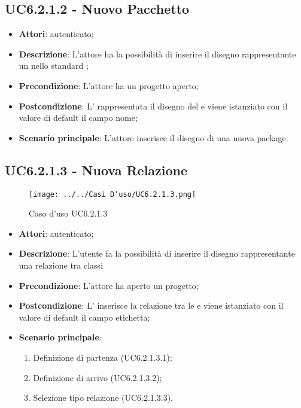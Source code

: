 \subsection{UC6.2.1.2 - Nuovo Pacchetto}
\label{ssec:UC6.2.1.2}
\begin{itemize}
\item \textbf{Attori}:  autenticato;
\item \textbf{Descrizione}: L'attore ha la possibilità di inserire il disegno rappresentante un  nello standard ;
\item \textbf{Precondizione}: L'attore ha un progetto aperto;
\item \textbf{Postcondizione}: L' rappresentata il disegno del  e viene istanziato con il valore di default il campo nome;
\item \textbf{Scenario principale}: L'attore inserisce il disegno di una nuova package.
\end{itemize}
\newpage
\subsection{UC6.2.1.3 - Nuova Relazione}
\label{ssec:UC6.2.1.3}
\begin{figure}[h!]
\centering
\texttt{[image: ../../Casi D'uso/UC6.2.1.3.png]}
\caption{Caso d'uso UC6.2.1.3}
 \end{figure}
\begin{itemize}
\item \textbf{Attori}:  autenticato;
\item \textbf{Descrizione}: L'utente fa la possibilità di inserire il disegno rappresentante una relazione tra classi
\item \textbf{Precondizione}: L'attore ha aperto un progetto;
\item \textbf{Postcondizione}: L' inserisce la relazione tra le  e viene istanziato con il valore di default il campo etichetta;
\item \textbf{Scenario principale}: \begin{enumerate}\item Definizione  di partenza (UC6.2.1.3.1);\item Definizione  di arrivo (UC6.2.1.3.2);\item Selezione tipo relazione (UC6.2.1.3.3).
 \end{enumerate}
\end{itemize}
